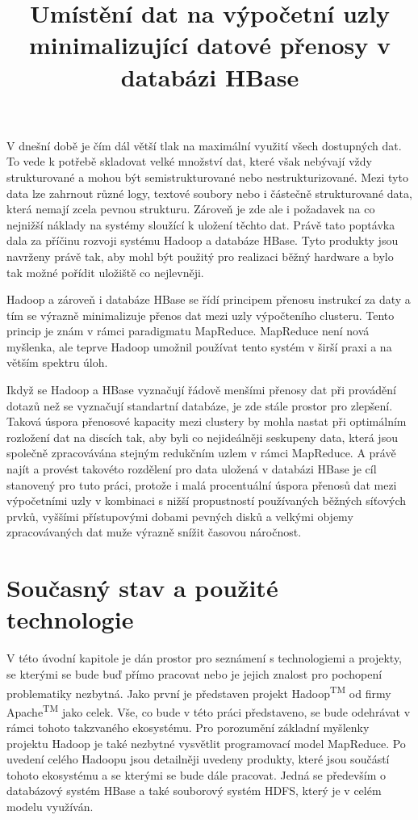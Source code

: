 \documentclass[thesis=M,czech]{FITthesis}[2012/06/26]
\title{Umístění dat na výpočetní uzly minimalizující datové přenosy v databázi HBase}
\begin{document}
\lstset{language=sh}  

\begin{introduction}
V dnešní době je čím dál větší tlak na maximální využití všech dostupných dat. To vede k potřebě skladovat velké množství dat, které však nebývají vždy strukturované a mohou být semistrukturované nebo nestrukturizované. Mezi tyto data lze zahrnout různé logy, textové soubory nebo i částečně strukturované data, která nemají zcela pevnou strukturu. Zároveň je zde ale i požadavek na co nejnižší náklady na  systémy sloužící k uložení těchto dat. Právě tato poptávka dala za příčinu rozvoji systému Hadoop a databáze HBase. Tyto produkty jsou navrženy právě tak, aby mohl být použitý pro realizaci běžný hardware a bylo tak možné pořídit uložiště co nejlevněji. 


Hadoop a zároveň i databáze HBase se řídí principem přenosu instrukcí za daty a tím se výrazně minimalizuje přenos dat mezi uzly výpočteního clusteru. Tento princip je znám v rámci paradigmatu MapReduce. MapReduce není nová myšlenka, ale teprve Hadoop umožnil používat tento systém v širší praxi a na větším spektru úloh.


Ikdyž se Hadoop a HBase vyznačují řádově menšími přenosy dat při provádění dotazů než se vyznačují standartní databáze, je zde stále prostor pro zlepšení. Taková úspora přenosové kapacity mezi clustery by mohla nastat při optimálním rozložení dat na discích tak, aby byli co nejideálněji seskupeny data, která jsou společně zpracovávána stejným redukčním uzlem v rámci MapReduce. A právě najít a provést takovéto rozdělení pro data uložená v databázi HBase je cíl stanovený pro tuto práci, protože i malá procentuální úspora přenosů dat mezi výpočetními uzly v kombinaci s nižší propustností používaných běžných síťových prvků, vyššími přístupovými dobami pevných disků a velkými objemy zpracovávaných dat muže výrazně snížit časovou náročnost. 


\end{introduction}

\chapter{Současný stav a použité technologie}
V této úvodní kapitole je dán prostor pro seznámení s technologiemi a projekty, se kterými se bude buď přímo pracovat nebo je jejich znalost pro pochopení problematiky nezbytná. Jako první je představen projekt Hadoop\textsuperscript{TM} od firmy Apache\textsuperscript{TM} jako celek. Vše, co bude v této práci představeno, se bude odehrávat v rámci tohoto takzvaného ekosystému. Pro porozumění základní myšlenky projektu Hadoop je také nezbytné vysvětlit programovací model MapReduce. Po uvedení celého Hadoopu jsou detailněji uvedeny produkty, které jsou součástí tohoto ekosystému a se kterými se bude dále pracovat. Jedná se především o databázový systém HBase a také souborový systém HDFS, který je v celém modelu využíván. 
\end{document}
